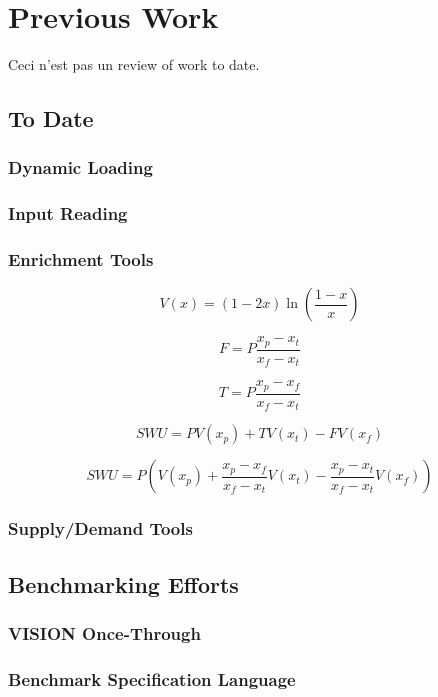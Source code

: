 \chapter{Previous Work}\label{ch:prevwork}

Ceci n'est pas un review of work to date. 

\section{\Cyclus To Date}

\subsection{Dynamic Loading}
\subsection{Input Reading}
\subsection{Enrichment Tools}\label{sec:prev-enrich}


\begin{equation}\label{eqs:enr-value}
  V(x) = (1 - 2x) \ln \left( \frac{1-x}{x} \right)
\end{equation}

\begin{equation}\label{eqs:enr-feed}
  F = P \frac{x_{p} - x_{t}}{x_{f} - x_{t}}
\end{equation}

\begin{equation}\label{eqs:enr-tails}
  T = P \frac{x_{p} - x_{f}}{x_{f} - x_{t}}
\end{equation}

\begin{equation}\label{eqs:enr-swu}
  SWU = P V(x_{p}) + T V(x_{t}) - F V(x_{f})
\end{equation}

\begin{equation}\label{eqs:enr-swu-p}
  SWU = P \left( V(x_{p}) + \frac{x_{p} - x_{f}}{x_{f} - x_{t}} V(x_{t}) 
        - \frac{x_{p} - x_{t}}{x_{f} - x_{t}} V(x_{f}) \right)
\end{equation}



\subsection{Supply/Demand Tools}
\subsection{\Cyclopts}

\section{Benchmarking Efforts}

\subsection{VISION Once-Through}
\subsection{Benchmark Specification Language}